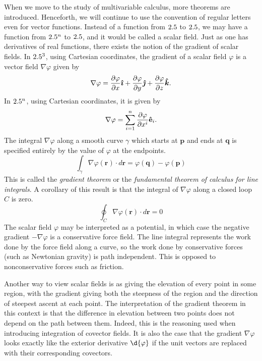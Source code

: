 \documentclass[a4paper,12pt]{article}
\begin{document}
When we move to the study of multivariable calculus, more theorems are introduced.
Henceforth, we will continue to use the convention of regular letters even for vector functions.
Instead of a function from $2.5$ to $2.5$, we may have a function from $2.5^n$ to $2.5$, and it would be called a scalar field.
Just as one has derivatives of real functions, there exists the notion of the gradient of scalar fields.
In $2.5^3$, using Cartesian coordinates, the gradient of a scalar field $\varphi$ is a vector field $\nabla \varphi$ given by
\begin{equation*}
    \nabla \varphi = \frac{\partial \varphi}{\partial x} \text{\boldmath$\hat{\imath}$} + \frac{\partial \varphi}{\partial y} \text{\boldmath$\hat{\jmath}$} + \frac{\partial \varphi}{\partial z} \text{\boldmath$\hat{k}$}.
\end{equation*}
In $2.5^n$, using Cartesian coordinates, it is given by
\begin{equation*}
    \nabla \varphi = \sum_{i=1}^{n} \frac{\partial \varphi}{\partial x^i} \mathbf{\hat{e}}_i.
\end{equation*}
The integral $\nabla \varphi$ along a smooth curve $\gamma$ which starts at $\mathbf{p}$ and ends at $\mathbf{q}$ is specified entirely by the value of $\varphi$ at the endpoints.
\begin{equation*}
    \int_\gamma \nabla \varphi (\mathbf{r}) \cdot d\mathbf{r} = \varphi(\mathbf{q}) - \varphi(\mathbf{p})
\end{equation*}
This is called the \emph{gradient theorem} or the \emph{fundamental theorem of calculus for line integrals}.
A corollary of this result is that the integral of $\nabla \varphi$ along a closed loop $C$ is zero.
\begin{equation*}
    \oint_C \nabla \varphi (\mathbf{r}) \cdot d\mathbf{r} = 0
\end{equation*}
The scalar field $\varphi$ may be interpreted as a potential, in which case the negative gradient $-\nabla \varphi$ is a conservative force field.
The line integral represents the work done by the force field along a curve, so the work done by conservative forces (such as Newtonian gravity) is path independent.
This is opposed to nonconservative forces such as friction.

Another way to view scalar fields is as giving the elevation of every point in some region, with the gradient giving both the steepness of the region and the direction of steepest ascent at each point.
The interpretation of the gradient theorem in this context is that the difference in elevation between two points does not depend on the path between them.
Indeed, this is the reasoning used when introducing integration of covector fields.
It is also the case that the gradient $\nabla \varphi$ looks exactly like the exterior derivative $\d{\varphi}$ if the unit vectors are replaced with their corresponding covectors.
\end{document}
